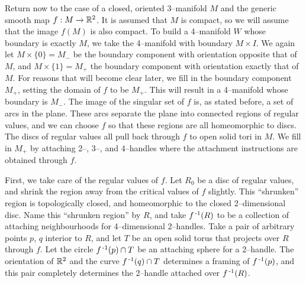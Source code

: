 Return now to the case of a closed, oriented 3--manifold $M$ and the generic smooth map $f:M\to \mathbb{R}^2$.
It is assumed that $M$ is compact, so we will assume that the image $f(M)$ is also compact.
To build a 4--manifold $W$ whose boundary is exactly $M$, we take the 4--manifold with boundary $M\times I$.
We again let $M\times \{0\}=M_-$ be the boundary component with orientation opposite that of $M$, and $M\times\{1\}=M_+$ the boundary component with orientation exactly that of $M$.
For reasons that will become clear later, we fill in the boundary component $M_+$, setting the domain of $f$ to be $M_+$.
This will result in a 4--manifold whose boundary is $M_-$.
The image of the singular set of $f$ is, as stated before, a set of arcs in the plane.
These arcs separate the plane into connected regions of regular values, and we can choose $f$ so that these regions are all homeomorphic to discs.
The discs of regular values all pull back through $f$ to open solid tori in $M$.
We fill in $M_+$ by attaching 2--, 3--, and 4--handles where the attachment instructions are obtained through $f$.

First, we take care of the regular values of $f$.
Let $R_0$ be a disc of regular values, and shrink the region away from the critical values of $f$ slightly.
This ``shrunken'' region is topologically closed, and homeomorphic to the closed 2--dimensional disc.
Name this ``shrunken region'' by $R$, and take $f^{\,\text{-}1} (R)$ to be a collection of attaching neighbourhoods for 4--dimensional 2--handles.
Take a pair of arbitrary points $p$, $q$ interior to $R$, and let $T$ be an open solid torus that projects over $R$ through $f$.
Let the circle $f^{\,\text{-}1} (p)\cap T$ be an attaching sphere for a 2--handle.
The orientation of $\mathbb{R}^2$ and the curve $f^{\,\text{-}1} (q)\cap T$ determines a framing of $f^{\,\text{-}1} (p)$, and this pair completely determines the 2--handle attached over $f^{\,\text{-}1} (R)$.


